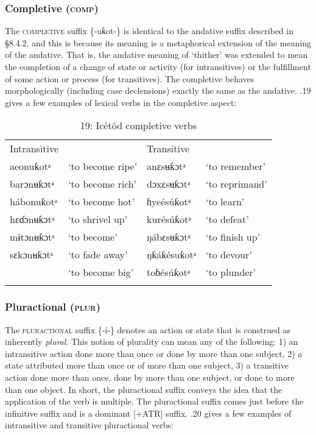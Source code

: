 \begin{table}
\subsubsection{Completive (\textsc{comp})}

The \textsc{completive} suffix \{-uƙot-\} is identical to the andative suffix described in §8.4.2, and this is because its meaning is a metaphorical extension of the meaning of the andative. That is, the andative meaning of ‘thither’ was extended to mean the completion of a change of state or activity (for intransitives) or the fulfillment of some action or process (for transitives). The completive behaves morphologically (including case declensions) exactly the same as the andative. .19 gives a few examples of lexical verbs in the completive aspect:


\begin{table}
\caption{19: Icétôd completive verbs}
\label{tab:8}


\begin{tabularx}{\textwidth}{XXXX}
\lsptoprule

Intransitive &  & \multicolumn{2}{X}{Transitive}\\
aeonuƙotᵃ & ‘to become ripe’ & anɛsʉƙɔtᵃ & ‘to remember’\\
barɔnʉƙɔtᵃ & ‘to become rich’ & dɔxɛsʉƙɔtᵃ & ‘to reprimand’\\
hábonuƙotᵃ & ‘to become hot’ & ɦyeésúƙotᵃ & ‘to learn’\\
hɛɗɔnʉƙɔtᵃ & ‘to shrivel up’ & kurésúƙotᵃ & ‘to defeat’\\
mɨtɔnʉƙɔtᵃ & ‘to become’ & ŋábɛsʉƙɔtᵃ & ‘to finish up’\\
sɛkɔnʉƙɔtᵃ & ‘to fade away’ & ŋƙáƙésuƙotᵃ & ‘to devour’\\ & ‘to become big’ & toɓésúƙotᵃ & ‘to plunder’\\
\lspbottomrule
\end{tabularx}
\end{table}

\subsubsection{Pluractional (\textsc{plur})}

The \textsc{pluractional} suffix \{-í-\} denotes an action or state that is construed as inherently \textit{plural}. This notion of plurality can mean any of the following: 1) an intransitive action done more than once or done by more than one subject, 2) a state attributed more than once or of more than one subject, 3) a transitive action done more than once, done by more than one subject, or done to more than one object. In short, the pluractional suffix conveys the idea that the application of the verb is multiple. The pluractional suffix comes just before the infinitive suffix and is a dominant [+ATR] suffix. .20 gives a few examples of intransitive and transitive pluractional verbs:



\end{table}
